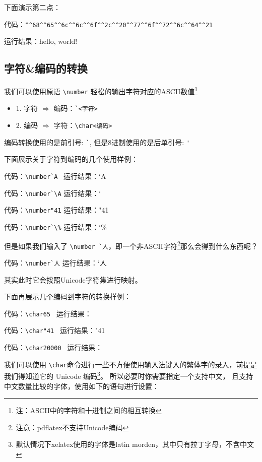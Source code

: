 \documentclass[fontset=windows, 12pt]{article}
\begin{document}
下面演示第二点：

代码：\verb |^^68^^65^^6c^^6c^^6f^^2c^^20^^77^^6f^^72^^6c^^64^^21|

运行结果：^^68^^65^^6c^^6c^^6f^^2c^^20^^77^^6f^^72^^6c^^64^^21

\subsection{字符\&编码的转换}
我们可以使用原语 \verb |\number| 轻松的输出字符对应的ASCII数值\footnote{注：ASCII中的字符和十进制之间的相互转换}
\begin{itemize}
    \item 1. 字符 $\Rightarrow$ 编码：\verb |`<字符>|
    \item 2. 编码 $\Rightarrow$ 字符：\verb |\char<编码>|
\end{itemize}

\begin{tcolorbox}[colback=red!5!white,colframe=red!75!black,title=注意]
 编码转换使用的是前引号: \verb |`|, 但是8进制使用的是后单引号: \verb |'| 
\end{tcolorbox}


下面展示关于字符到编码的几个使用样例：

代码：\verb |\number`A| ~运行结果：\number`A

代码：\verb |\number`\A| 运行结果：\number`\A

代码：\verb |\number"41| 运行结果：\number"41

代码：\verb |\number`\%| 运行结果：\number`\%


\noindent 但是如果我们输入了 \verb |\number `人|，即一个非ASCII字符\footnote{注意：pdflatex不支持Unicode编码}那么会得到什么东西呢？

代码：\verb |\number`人| 运行结果：\number`人

\noindent 其实此时它会按照Unicode字符集进行映射。

下面再展示几个编码到字符的转换样例：

代码：\verb |\char65| ~运行结果：

代码：\verb |\char"41| ~运行结果：\char"41

代码：\verb |\char20000| ~运行结果：

我们可以使用 \verb |\char|命令进行一些不方便使用输入法键入的繁体字的录入，前提是我们得知道它的 Unicode 
编码\footnote{默认情况下xelatex使用的字体是latin morden，其中只有拉丁字母，不含中文}。
所以必要时你需要指定一个支持中文， 且支持中文数量比较的字体，使用如下的语句进行设置：
\end{document}
